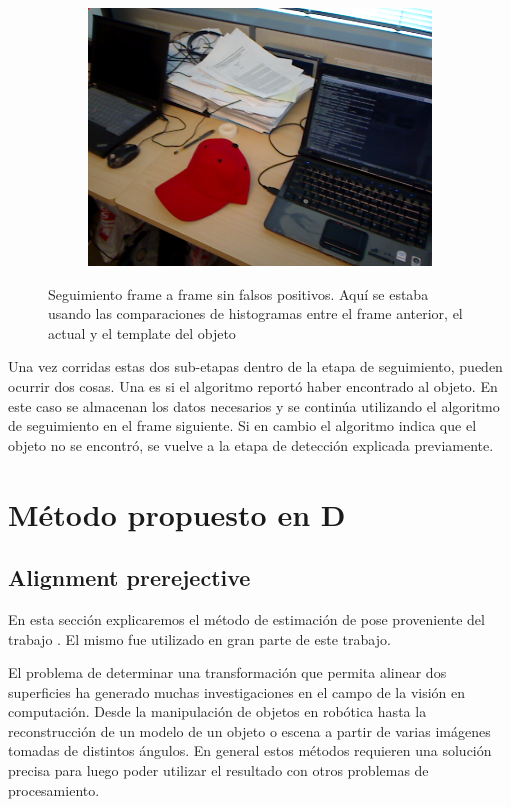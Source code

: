 \begin{figure}
\begin{subfigure}[b]{0.3\textwidth}
		\includegraphics[width=\textwidth]{img/seguimiento_frame_template/frame_template-desk_1-coffee_mug_5-frame_34.png}
	\end{subfigure}

	\caption{Seguimiento frame a frame sin falsos positivos. Aquí se estaba usando las comparaciones de histogramas entre el frame anterior, el actual y el template del objeto}
	\label{frame_template_tracking}
\end{figure}

Una vez corridas estas dos sub-etapas dentro de la etapa de seguimiento, pueden ocurrir dos cosas. Una es si el algoritmo reportó haber encontrado al objeto. En este caso se almacenan los datos necesarios y se continúa utilizando el algoritmo de seguimiento en el frame siguiente. Si en cambio el algoritmo indica que el objeto no se encontró, se vuelve a la etapa de detección explicada previamente.



\section{Método propuesto en D}
\subsection{Alignment prerejective}\label{alignment_prerejective}
En esta sección explicaremos el método de estimación de pose proveniente del trabajo \cite{6630856}. El mismo fue utilizado en gran parte de este trabajo.

El problema de determinar una transformación que permita alinear dos superficies ha generado muchas investigaciones en el campo de la visión en computación. Desde la manipulación de objetos en robótica hasta la reconstrucción de un modelo de un objeto o escena a partir de varias imágenes tomadas de distintos ángulos. En general estos métodos requieren una solución precisa para luego poder utilizar el resultado con otros problemas de procesamiento.

